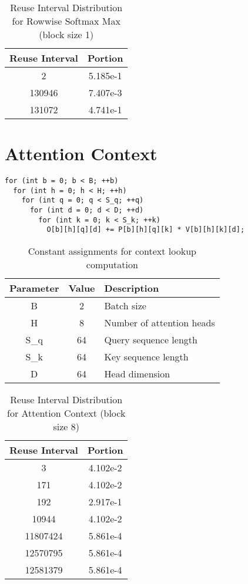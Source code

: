 \documentclass[conference]{article}
\begin{document}
\begin{table}[H]
\centering
\begin{tabular}{|c|c|}
    \hline
    Reuse Interval & Portion \\ 
    \hline
    2 & 5.185e-1 \\ 
    130946 & 7.407e-3 \\ 
    131072 & 4.741e-1 \\ 
    \hline
\end{tabular}
\caption{Reuse Interval Distribution for Rowwise Softmax Max (block size 1)}
\end{table}

\section{Attention Context}
\begin{verbatim}
for (int b = 0; b < B; ++b)
  for (int h = 0; h < H; ++h)
    for (int q = 0; q < S_q; ++q)
      for (int d = 0; d < D; ++d)
        for (int k = 0; k < S_k; ++k)
          O[b][h][q][d] += P[b][h][q][k] * V[b][h][k][d];
\end{verbatim}

\begin{table}[H]
\centering
\begin{tabular}{|c|c|l|}
    \hline
    Parameter & Value & Description \\
    \hline
    B & 2 & Batch size \\
    H & 8 & Number of attention heads \\
    S\_q & 64 & Query sequence length \\
    S\_k & 64 & Key sequence length \\
    D & 64 & Head dimension \\
    \hline
  \end{tabular}
  \caption{Constant assignments for context lookup computation}
\end{table}

\begin{table}[H]
\centering
\begin{tabular}{|c|c|}
    \hline
    Reuse Interval & Portion \\ 
    \hline
    3 & 4.102e-2 \\ 
    171 & 4.102e-2 \\ 
    192 & 2.917e-1 \\ 
    10944 & 4.102e-2 \\ 
    11807424 & 5.861e-4 \\ 
    12570795 & 5.861e-4 \\ 
    12581379 & 5.861e-4 \\ 
    \hline
\end{tabular}
\caption{Reuse Interval Distribution for Attention Context (block size 8)}
\end{table}
\end{document}
